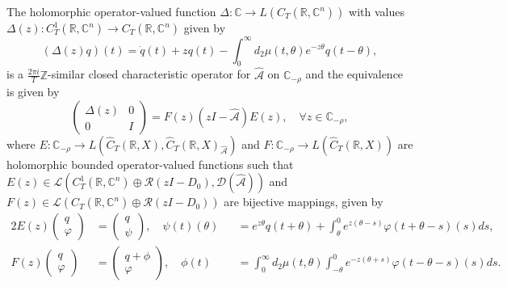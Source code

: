 \documentclass[english]{myarticle}
\begin{document}
\begin{sloppypar}
\begin{theorem} \label{thm:charmatrixDDEinfinite}
The holomorphic operator-valued function $\Delta : \mathbb{C} \to L(C_T(\mathbb{R},\mathbb{C}^n))$ with values $\Delta(z) : C_T^1(\mathbb{R},\mathbb{C}^n) \to C_T(\mathbb{R},\mathbb{C}^n)$ given by
\begin{equation*}
    (\Delta(z)q)(t) = \dot{q}(t) + z q(t) - \int_0^\infty d_2 \mu(t,\theta) e^{-z \theta} q(t-\theta),
\end{equation*}
is a $\frac{2\pi i}{T}\mathbb{Z}$-similar closed characteristic operator for $\hat{\mathcal{A}}$ on $\mathbb{C}_{-\rho}$ and the equivalence is given by
\begin{equation*}
    \begin{pmatrix}
        \Delta(z) & 0 \\
        0 & I 
    \end{pmatrix}
    =
    F(z)(z I - \hat{\mathcal{A}})E(z), \quad \forall z \in \mathbb{C}_{-\rho},
\end{equation*}
where $E : \mathbb{C}_{-\rho} \to L(\hat{C}_T(\mathbb{R},X),\hat{C}_T(\mathbb{R},X)_{\hat{\mathcal{A}}})$ and $F : \mathbb{C}_{-\rho} \to L(\hat{C}_T(\mathbb{R},X))$ are holomorphic bounded operator-valued functions such that $E(z) \in \mathcal{L}(C_T^1(\mathbb{R},\mathbb{C}^n) \oplus \mathcal{R}(zI-D_0),\mathcal{D}(\hat{\mathcal{A}}))$ and $F(z) \in \mathcal{L}(C_T(\mathbb{R},\mathbb{C}^n) \oplus \mathcal{R}(zI-D_0))$ are bijective mappings, given by
\begin{alignat*}{2}
    E(z)
    \begin{pmatrix}
    q\\
    \varphi
    \end{pmatrix}
    &=
    \begin{pmatrix}
    q\\
    \psi
    \end{pmatrix}, \quad
        \psi(t)(\theta) &&= e^{z \theta}q(t+\theta)+ \int_{\theta}^0 e^{z(\theta-s)}\varphi(t+\theta-s)(s) ds, \\
    F(z)
    \begin{pmatrix}
    q\\
    \varphi
    \end{pmatrix}
    &=
    \begin{pmatrix}
    q + \phi\\
    \varphi
    \end{pmatrix}, \quad
        \phi(t) &&= \int_0^\infty d_2 \mu(t,\theta) \int_{-\theta}^0 e^{-z(\theta+s)}\varphi(t-\theta-s)(s) ds.
\end{alignat*}

\end{theorem}
\end{sloppypar}
\end{document}
